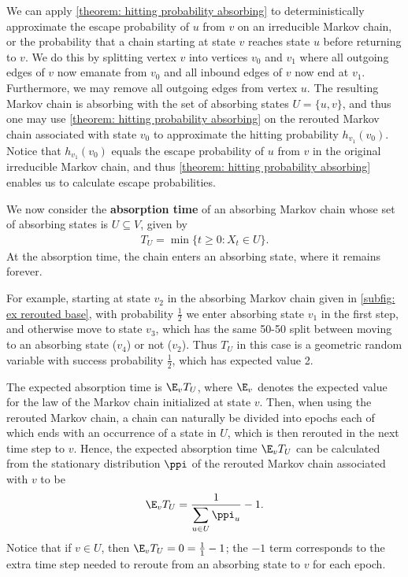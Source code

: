 \begin{remark}\label{remark: escape probability}
We can apply \cref{theorem: hitting probability absorbing} 
to deterministically approximate the escape probability of $u$ from $v$ 
on an irreducible Markov chain, or the probability that a chain 
starting at state $v$ reaches state $u$ before returning to $v$.
We do this by splitting vertex $v$ into vertices $v_0$ and $v_1$ 
where all outgoing edges of $v$ now emanate from $v_0$ 
and all inbound edges of $v$ now end at $v_1$.
Furthermore, we may remove all outgoing edges from vertex $u$.
The resulting Markov chain is absorbing 
with the set of absorbing states $U=\{u,v\}$, 
and thus one may use \cref{theorem: hitting probability absorbing} 
on the rerouted Markov chain associated with state $v_0$ 
to approximate the hitting probability $h_{v_1}(v_0)$.
Notice that $h_{v_1}(v_0)$ equals the escape probability 
of $u$ from $v$ in the original irreducible Markov chain, 
and thus \cref{theorem: hitting probability absorbing} 
enables us to calculate escape probabilities.
\end{remark}

We now consider the \textbf{absorption time} of an absorbing Markov chain
whose set of absorbing states is $U \subseteq V$, given by
\begin{align*}
    T_U = \min\{t \geq 0: X_t \in U\}.
\end{align*}
At the absorption time, the chain enters an absorbing state, 
where it remains forever.

For example, starting at state $v_2$ in the absorbing Markov chain given in \cref{subfig: ex rerouted base}, with probability $\frac{1}{2}$ we enter absorbing state $v_1$ in the first step, and otherwise move to state $v_3$, which has the same 50-50 split between moving to an absorbing state ($v_4$) or not ($v_2$).
Thus $T_U$ in this case is a geometric random variable with success probability $\frac{1}{2}$, which has expected value 2.

The expected absorption time is $\E_v T_U$, 
where $\E_v$ denotes the expected value for the law 
of the Markov chain initialized at state $v$.
Then, when using the rerouted Markov chain, 
a chain can naturally be divided into epochs 
each of which ends with an occurrence of a state in $U$, 
which is then rerouted in the next time step to $v$.
Hence, the expected absorption time $\E_v T_U$ 
can be calculated from the stationary distribution $\ppi$ 
of the rerouted Markov chain associated with $v$ to be
\begin{align*}
    \E_v T_U = \frac{1}{\displaystyle\sum_{u \in U} \ppi_u}-1.
\end{align*}
Notice that if $v \in U$, then $\E_v T_U = 0=\frac{1}{1}-1$; 
the $-1$ term corresponds to the extra time step needed to reroute 
from an absorbing state to $v$ for each epoch.

